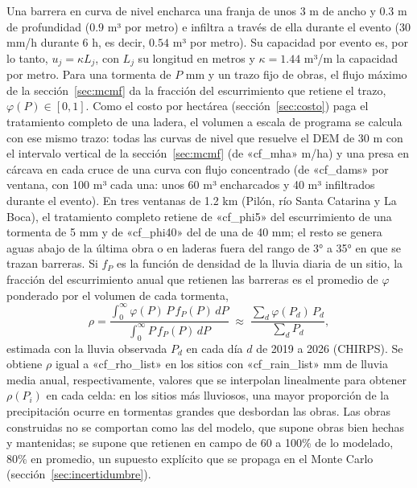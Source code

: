 Una barrera en curva de nivel encharca una franja de unos 3 m de ancho y 0.3 m de profundidad ($0.9$ m³ por metro) e infiltra a través de ella durante el evento (30 mm/h durante 6 h, es decir, $0.54$ m³ por metro). Su capacidad por evento es, por lo tanto, $u_j = \kappa L_j$, con $L_j$ su longitud en metros y $\kappa = 1.44$ m³/m la capacidad por metro. Para una tormenta de $P$ mm y un trazo fijo de obras, el flujo máximo de la sección~\ref{sec:mcmf} da la fracción del escurrimiento que retiene el trazo, $\varphi(P)\in[0,1]$. Como el costo por hectárea (sección~\ref{sec:costo}) paga el tratamiento completo de una ladera, el volumen a escala de programa se calcula con ese mismo trazo: todas las curvas de nivel que resuelve el DEM de 30 m con el intervalo vertical de la sección~\ref{sec:mcmf} (de «cf_mha» m/ha) y una presa en cárcava en cada cruce de una curva con flujo concentrado (de «cf_dams» por ventana, con 100 m³ cada una: unos 60 m³ encharcados y 40 m³ infiltrados durante el evento). En tres ventanas de 1.2 km (Pilón, río Santa Catarina y La Boca), el tratamiento completo retiene de «cf_phi5» del escurrimiento de una tormenta de 5 mm y de «cf_phi40» del de una de 40 mm; el resto se genera aguas abajo de la última obra o en laderas fuera del rango de 3° a 35° en que se trazan barreras. Si $f_P$ es la función de densidad de la lluvia diaria de un sitio, la fracción del escurrimiento anual que retienen las barreras es el promedio de $\varphi$ ponderado por el volumen de cada tormenta,
\begin{equation}
\rho=\frac{\displaystyle\int_0^\infty \varphi(P)\,P\,f_P(P)\,dP}{\displaystyle\int_0^\infty P\,f_P(P)\,dP}\;\approx\;\frac{\sum_d \varphi(P_d)\,P_d}{\sum_d P_d},
\end{equation}
estimada con la lluvia observada $P_d$ en cada día $d$ de 2019 a 2026 (CHIRPS). Se obtiene $\rho$ igual a «cf_rho_list» en los sitios con «cf_rain_list» mm de lluvia media anual, respectivamente, valores que se interpolan linealmente para obtener $\rho(P_i)$ en cada celda: en los sitios más lluviosos, una mayor proporción de la precipitación ocurre en tormentas grandes que desbordan las obras. Las obras construidas no se comportan como las del modelo, que supone obras bien hechas y mantenidas; se supone que retienen en campo de 60 a 100\% de lo modelado, 80\% en promedio, un supuesto explícito que se propaga en el Monte Carlo (sección~\ref{sec:incertidumbre}).

